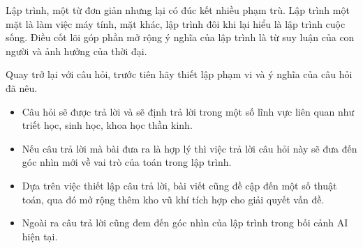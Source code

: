 Lập trình, một từ đơn giản nhưng lại có đúc kết nhiều phạm trù. Lập trình một mặt là làm việc máy tính, mặt khác, lập trình đôi khi lại hiểu là lập trình cuộc sống. Điều cốt lõi góp phần mở rộng ý nghĩa của lập trình là từ suy luận của con người và ảnh hưởng của thời đại.

Quay trở lại với câu hỏi, trước tiên hãy thiết lập phạm vi và ý nghĩa của câu hỏi đã nêu.
\begin{itemize}
	\item Câu hỏi sẽ được trả lời và sẽ định trả lời trong một số lĩnh vực liên quan như triết học, sinh học, khoa học thần kinh.
	\item Nếu câu trả lời mà bài đưa ra là hợp lý thì việc trả lời câu hỏi này sẽ đưa đến góc nhìn mới về vai trò của toán trong lập trình.
	\item Dựa trên việc thiết lập câu trả lời, bài viết cũng đề cập đến một số thuật toán, qua đó mở rộng thêm kho vũ khí tích hợp cho giải quyết vấn đề.
	\item Ngoài ra câu trả lời cũng đem đến góc nhìn của lập trình trong bối cảnh AI hiện tại. 
\end{itemize}
